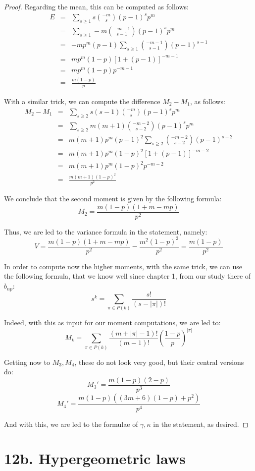 \documentclass[12pt]{amsbook}
\begin{document}
\begin{proof}
Regarding the mean, this can be computed as follows:
\begin{eqnarray*}
E
&=&\sum_{s\geq1}s\binom{-m}{s}(p-1)^sp^m\\
&=&\sum_{s\geq1}-m\binom{-m-1}{s-1}(p-1)^sp^m\\
&=&-mp^m(p-1)\sum_{s\geq1}\binom{-m-1}{s-1}(p-1)^{s-1}\\
&=&mp^m(1-p)[1+(p-1)]^{-m-1}\\
&=&mp^m(1-p)p^{-m-1}\\
&=&\frac{m(1-p)}{p}
\end{eqnarray*}

With a similar trick, we can compute the difference $M_2-M_1$, as follows:
\begin{eqnarray*}
M_2-M_1
&=&\sum_{s\geq2}s(s-1)\binom{-m}{s}(p-1)^sp^m\\
&=&\sum_{s\geq2}m(m+1)\binom{-m-2}{s-2}(p-1)^sp^m\\
&=&m(m+1)p^m(p-1)^2\sum_{s\geq2}\binom{-m-2}{s-2}(p-1)^{s-2}\\
&=&m(m+1)p^m(1-p)^2[1+(p-1)]^{-m-2}\\
&=&m(m+1)p^m(1-p)^2p^{-m-2}\\
&=&\frac{m(m+1)(1-p)^2}{p^2}
\end{eqnarray*}

We conclude that the second moment is given by the following formula:
$$M_2=\frac{m(1-p)(1+m-mp)}{p^2}$$

Thus, we are led to the variance formula in the statement, namely:
$$V=\frac{m(1-p)(1+m-mp)}{p^2}-\frac{m^2(1-p)^2}{p^2}=\frac{m(1-p)}{p^2}$$

In order to compute now the higher moments, with the same trick, we can use the following formula, that we know well since chapter 1, from our study there of $b_{np}$:
$$s^k=\sum_{\pi\in P(k)}\frac{s!}{(s-|\pi|)!}$$

Indeed, with this as input for our moment computations, we are led to:
$$M_k=\sum_{\pi\in P(k)}\frac{(m+|\pi|-1)!}{(m-1)!}\left(\frac{1-p}{p}\right)^{|\pi|}$$

Getting now to $M_3,M_4$, these do not look very good, but their central versions do:
$$M_3'=\frac{m(1-p)(2-p)}{p^3}$$
$$M_4'=\frac{m(1-p)((3m+6)(1-p)+p^2)}{p^4}$$

And with this, we are led to the formulae of $\gamma,\kappa$ in the statement, as desired.
\end{proof}

\section*{12b. Hypergeometric laws}
\end{document}
